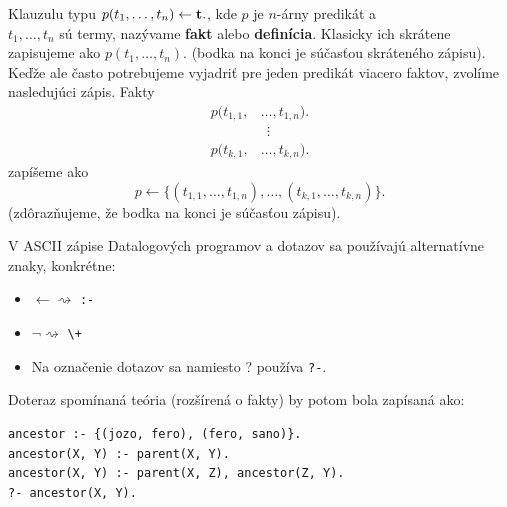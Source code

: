\begin{definition}
Klauzulu typu $p(t_1, \dots, t_n) \leftarrow \textbf{t}\space.$, kde $p$ je $n$-árny predikát a \\$t_1, \dots, t_n$
sú termy, nazývame \textbf{fakt} alebo \textbf{definícia}. Klasicky ich skrátene zapisujeme ako
$p(t_1, \dots, t_n).$ (bodka na konci je súčasťou skráteného zápisu). Keďže ale často potrebujeme
vyjadriť pre jeden predikát viacero faktov, zvolíme nasledujúci zápis. Fakty 
\begin{align*}
    p(t_{1, 1}, &\dots, t_{1, n}).\\
    &\ \ \vdots\\
    p(t_{k, 1}, &\dots, t_{k, n}).
\end{align*}
zapíšeme ako
    $$p \leftarrow \{(t_{1, 1}, \dots, t_{1, n}), \dots, (t_{k, 1}, \dots, t_{k, n})\}.$$
(zdôrazňujeme, že bodka na konci je súčasťou zápisu).
\end{definition}

V ASCII zápise Datalogových programov a dotazov sa používajú alternatívne znaky, konkrétne:
\begin{itemize}
\item $\leftarrow \rightsquigarrow$ \texttt{:-}
\item $\lnot \rightsquigarrow$ \texttt{\textbackslash+}
\item Na označenie dotazov sa namiesto ? používa \texttt{?-}.
\end{itemize}

Doteraz spomínaná teória (rozšírená o fakty) by potom bola zapísaná ako:
\begin{priklad}
\begin{verbatim}
ancestor :- {(jozo, fero), (fero, sano)}.
ancestor(X, Y) :- parent(X, Y).
ancestor(X, Y) :- parent(X, Z), ancestor(Z, Y).
?- ancestor(X, Y).
\end{verbatim}
\end{priklad}